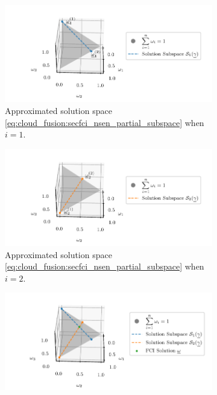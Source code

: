 \begin{figure}[htbp]
    \begin{subfigure}[htbp]{\textwidth}
        \begin{center}
            \includegraphics{figures/cloud_fusion_secfci_partial_sol_1.pdf}
        \end{center}
        \caption{Approximated solution space \eqref{eq:cloud_fusion:secfci_nsen_partial_subspace} when $i=1$.}
        \label{fig:cloud_fusion:secfci_partial_sol_1}
    \end{subfigure}
    \hfill
    \begin{subfigure}[htbp]{\textwidth}
        \begin{center}
            \includegraphics{figures/cloud_fusion_secfci_partial_sol_2.pdf}
        \end{center}
        \caption{Approximated solution space \eqref{eq:cloud_fusion:secfci_nsen_partial_subspace} when $i=2$.}
        \label{fig:cloud_fusion:secfci_partial_sol_2}
    \end{subfigure}
    \hfill
    \begin{subfigure}[htbp]{\textwidth}
        \begin{center}
            \includegraphics{figures/cloud_fusion_secfci_partial_sol_intersection.pdf}

\end{center}
\end{subfigure}
\end{figure}
